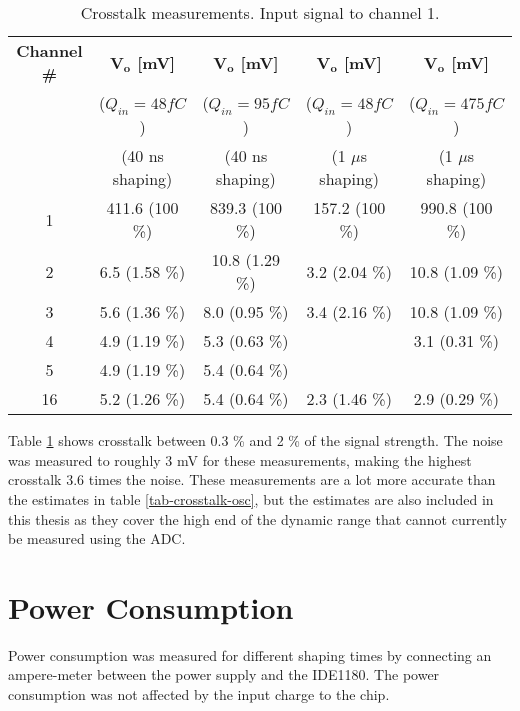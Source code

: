 \documentclass[../main/thesis.tex]{subfiles}
\begin{document}
\begin{table}[h!]
	\begin{center}
		\caption{Crosstalk measurements. Input signal to channel 1.}
		\label{tab-crosstalk-adc}
		\begin{tabular}{ccccc} \toprule
			\textbf{Channel \#} & \textbf{$\mathbf{V_o}$ [mV]} & \textbf{$\mathbf{V_o}$ [mV]} & \textbf{$\mathbf{V_o}$ [mV]} & \textbf{$\mathbf{V_o}$ [mV]} \\
			& ($Q_{in}=48 fC$) & ($Q_{in}=95 fC$) & ($Q_{in}=48 fC$)  & ($Q_{in}=475 fC$)\\ 
			& (40 ns shaping)& (40 ns shaping)& (1 $\mu$s shaping)& (1 $\mu$s shaping) \\ \midrule
			1       & 411.6 (100 \%) & 839.3 (100 \%)   & 157.2 (100 \%) & 990.8 (100 \%) \\
			2       & 6.5 (1.58 \%)    & 10.8 (1.29 \%)    & 3.2 (2.04 \%)   & 10.8 (1.09 \%)  \\
			3       & 5.6 (1.36 \%)    & 8.0 (0.95 \%)     & 3.4 (2.16 \%)   & 10.8 (1.09 \%)  \\
			4       & 4.9 (1.19 \%)    & 5.3 (0.63 \%)     &       & 3.1 (0.31 \%)   \\
			5       & 4.9 (1.19 \%)    & 5.4 (0.64 \%)     &       &       \\
			16      & 5.2 (1.26 \%)    & 5.4 (0.64 \%)     & 2.3 (1.46 \%)   & 2.9 (0.29 \%) \\ \bottomrule
		\end{tabular}
	\end{center}
\end{table}

Table \ref{tab-crosstalk-adc} shows crosstalk between 0.3 \% and 2 \% of the signal strength. The noise was measured to roughly 3 mV for these measurements, making the highest crosstalk 3.6 times the noise. These measurements are a lot more accurate than the estimates in table \ref{tab-crosstalk-osc}, but the estimates are also included in this thesis as they cover the high end of the dynamic range that cannot currently be measured using the ADC. 

\section{Power Consumption}
\label{ide-power}

Power consumption was measured for different shaping times by connecting an ampere-meter between the power supply and the IDE1180. The power consumption was not affected by the input charge to the chip. 
\end{document}
